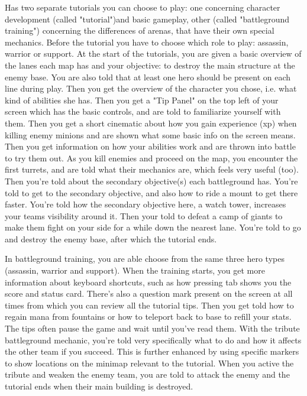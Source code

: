 Has two separate tutorials you can choose to play: one concerning character development (called "tutorial")and basic gameplay, other (called "battleground training") concerning the differences of arenas, that have their own special mechanics.
Before the tutorial you have to choose which role to play: assassin, warrior or support.
At the start of the tutorials, you are given a basic overview of the lanes each map has and your objective: to destroy the main structure at the enemy base. You are also told that at least one hero should be present on each line during play.
Then you get the overview of the character you chose, i.e. what kind of abilities she has.
Then you get a "Tip Panel" on the top left of your screen which has the basic controls, and are told to familiarize yourself with them.
Then you get a short cinematic about how you gain experience (xp) when killing enemy minions and are shown what some basic info on the screen means.
Then you get information on how your abilities work and are thrown into battle to try them out.
As you kill enemies and proceed on the map, you encounter the first turrets, and are told what their mechanics are, which feels very useful (too).
Then you're told about the secondary objective(s) each battleground has.
You're told to get to the secondary objective, and also how to ride a mount to get there faster.
You're told how the secondary objective here, a watch tower, increases your teams visibility around it.
Then your told to defeat a camp of giants to make them fight on your side for a while down the nearest lane.
You're told to go and destroy the enemy base, after which the tutorial ends.

In battleground training, you are able choose from the same three hero types (assassin, warrior and support).
When the training starts, you get more information about keyboard shortcuts, such as how pressing tab shows you the score and status card.
There's also a question mark present on the screen at all times from which you can review all the tutorial tips.
Then you get told how to regain mana from fountains or how to teleport back to base to refill your stats.
The tips often pause the game and wait until you've read them.
With the tribute battleground mechanic, you're told very specifically what to do and how it affects the other team if you succeed. This is further enhanced by using specific markers to show locations on the minimap relevant to the tutorial.
When you active the tribute and weaken the enemy team, you are told to attack the enemy and the tutorial ends when their main building is destroyed.

